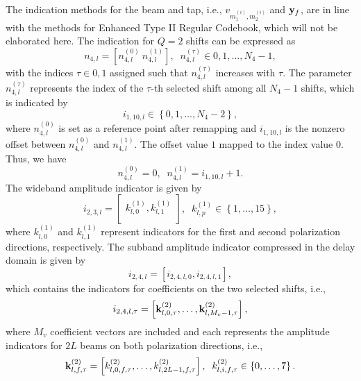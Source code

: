 \documentclass[lettersize,journal]{IEEEtran}
\begin{document}
The indication methods for the beam and tap, i.e., $v_{m_1^{\left(i\right)},m_2^{(i)}}$ and ${{\bf{y}}_f}$, are in line with the methods for Enhanced Type II Regular Codebook, which will not be elaborated here. The indication for $Q=2$ shifts can be expressed as 
\begin{equation}
n_{4,l}=\left[n_{4,l}^{\left(0\right)}\ n_{4,l}^{\left(1\right)}\right], \;\;n_{4,l}^{(\tau)}\in{0,1,\ldots,N_4-1},
\end{equation}
with the indices $\tau\in{0,1}$ assigned such that $n_{4,l}^{(\tau)}$ increases with $\tau$. The parameter $n_{4,l}^{(\tau)}$ represents the index of the $\tau$-th selected shift among all $N_4-1$ shifts, which is indicated by
\begin{equation}
 i_{1,10,l}\in\left\{0,1,\ldots,N_4-2\right\},
\end{equation}
where $n_{4,l}^{(0)}$ is set as a reference point after remapping and $i_{1,10,l}$ is the nonzero offset between $n_{4,l}^{(0)}$ and $n_{4,l}^{(1)}$. The offset value $1$ mapped to the index value $0$. Thus, we have 
\begin{equation}
    n_{4,l}^{(0)} = 0, \;\;n_{4,l}^{(1)} =  i_{1,10,l}+1.
\end{equation}
The wideband amplitude indicator is given by
\begin{equation}
i_{2,3,l}=\left[\begin{matrix}k_{l,0}^{\left(1\right)},k_{l,1}^{\left(1\right)}\\\end{matrix}\right], \;\;k_{l,p}^{(1)}\in\left\{1,\ldots,15\right\},
\end{equation}
where $k_{l,0}^{\left(1\right)}$ and $k_{l,1}^{\left(1\right)}$ represent indicators for the first and second polarization directions, respectively. The subband amplitude indicator compressed in the delay domain is given by
\begin{equation}
    i_{2,4,l}=\left[i_{2,4,l,0},i_{2,4,l,1}\right],
\end{equation}
which contains the indicators for coefficients on the two selected shifts, i.e.,
\begin{equation}\label{a113}
    i_{2,4,l,\tau}=\left[{\bf{k}}_{l,0,\tau}^{(2)},\ldots ,{\bf{k}}_{l,M_v-1,\tau}^{(2)}\right],
\end{equation}
where $M_v$ coefficient vectors are included and each represents the amplitude indicators for $2L$ beams on both polarization directions, i.e.,
\begin{equation}
{\bf{k}}_{l,f,\tau}^{(2)}=\left[k_{l,0,f,\tau}^{(2)},\ldots, k_{l,2L-1,f,\tau}^{(2)}\right], \;\;k_{l,i,f,\tau}^{(2)}\in\left\{0,\ldots,7\right\}.
\end{equation}
\end{document}
